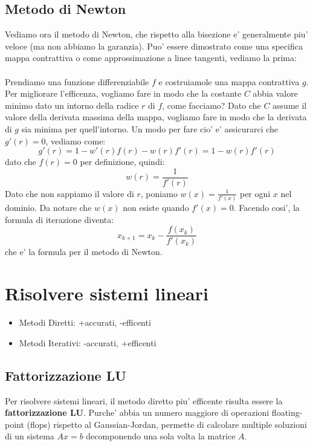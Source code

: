 \documentclass{report}
\begin{document}
\subsection{Metodo di Newton}
Vediamo ora il metodo di Newton, che rispetto alla bisezione e' generalmente piu' veloce (ma non abbiamo la garanzia). Puo' essere dimostrato come una specifica mappa contrattiva o come approssimazione a linee tangenti, vediamo la prima:\\\\
Prendiamo una funzione differenziabile $ f $ e costruiamole una mappa contrattiva $ g $. Per migliorare l'efficenza, vogliamo fare in modo che la costante $ C $ abbia valore minimo dato un intorno della radice $ r $ di $ f $, come facciamo? Dato che $ C $ assume il valore della derivata massima della mappa, vogliamo fare in modo che la derivata di $ g $ sia minima per quell'intorno. Un modo per fare cio' e' assicurarci che $ g'(r) = 0 $, vediamo come:
\[
  g'(r) = 1 - w'(r)f(r) - w(r)f'(r) = 1 - w(r)f'(r)
\]
dato che $ f(r) = 0 $ per definizione, quindi:
\[
  w(r) = \frac{1}{f'(r)}
\]
Dato che non sappiamo il valore di $ r $, poniamo $ w(x) = \frac{1}{f'(x)} $ per ogni $ x $ nel dominio. Da notare che $ w(x) $ non esiste quando $ f'(x) = 0 $. Facendo cosi', la formula di iterazione diventa:
\[
  x_{k+1} = x_k - \frac{f(x_k)}{f'(x_k)}
\]
che e' la formula per il metodo di Newton.
\section{Risolvere sistemi lineari}
\begin{itemize}
\item Metodi Diretti: +accurati, -efficenti
\item Metodi Iterativi: -accurati, +efficenti
\end{itemize}

\subsection{Fattorizzazione LU}
Per risolvere sistemi lineari, il metodo diretto piu' efficente risulta essere la \textbf{fattorizzazione LU}. Purche' abbia un numero maggiore di operazioni floating-point (flops) rispetto al Gaussian-Jordan, permette di calcolare multiple soluzioni di un sistema $ Ax = b $ decomponendo una sola volta la matrice $ A $. 
\end{document}
